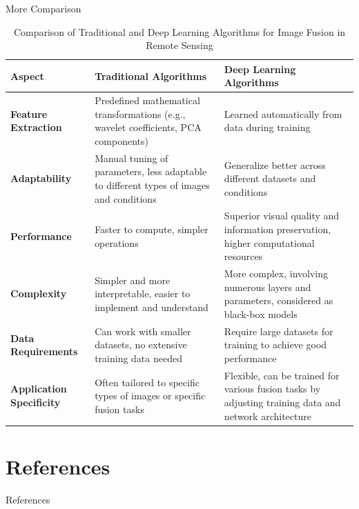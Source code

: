 \documentclass{beamer}
\begin{document}
\begin{frame}{More Comparison}
\begin{table}[ht]
    \centering
    \begin{tabular}{>{\raggedright\arraybackslash}p{4cm} >{\raggedright\arraybackslash}p{5.5cm} >{\raggedright\arraybackslash}p{5.5cm}}
        \toprule
        \textbf{Aspect} & \textbf{Traditional Algorithms} & \textbf{Deep Learning Algorithms} \\
        \midrule
        \textbf{Feature Extraction} & Predefined mathematical transformations (e.g., wavelet coefficients, PCA components) & Learned automatically from data during training \\
        \midrule
        \textbf{Adaptability} & Manual tuning of parameters, less adaptable to different types of images and conditions & Generalize better across different datasets and conditions \\
        \midrule
        \textbf{Performance} & Faster to compute, simpler operations & Superior visual quality and information preservation, higher computational resources \\
        \midrule
        \textbf{Complexity} & Simpler and more interpretable, easier to implement and understand & More complex, involving numerous layers and parameters, considered as black-box models \\
        \midrule
        \textbf{Data Requirements} & Can work with smaller datasets, no extensive training data needed & Require large datasets for training to achieve good performance \\
        \midrule
        \textbf{Application Specificity} & Often tailored to specific types of images or specific fusion tasks & Flexible, can be trained for various fusion tasks by adjusting training data and network architecture \\
        \bottomrule
    \end{tabular}
    \caption{Comparison of Traditional and Deep Learning Algorithms for Image Fusion in Remote Sensing}
    \label{tab:fusion_comparison}
\end{table}
\end{frame}
\section{References}
\begin{frame}[allowframebreaks]{References}
        \printbibliography
\end{frame}
\end{document}
